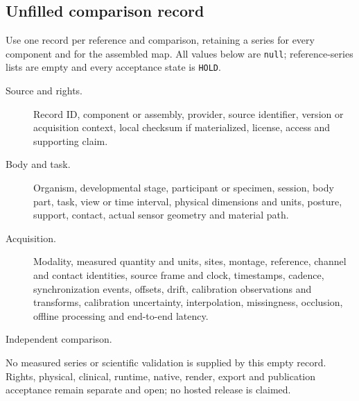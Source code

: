 \subsection*{Unfilled comparison record}

Use one record per reference and comparison, retaining a series for every
component and for the assembled map. All values below are \texttt{null};
reference-series lists are empty and every acceptance state is \texttt{HOLD}.

\begin{description}
\item[Source and rights.] Record ID, component or assembly, provider, source
identifier, version or acquisition context, local checksum if materialized,
license, access and supporting claim.
\item[Body and task.] Organism, developmental stage, participant or specimen,
session, body part, task, view or time interval, physical dimensions and units,
posture, support, contact, actual sensor geometry and material path.
\item[Acquisition.] Modality, measured quantity and units, sites, montage,
reference, channel and contact identities, source frame and clock, timestamps,
cadence, synchronization events, offsets, drift, calibration observations and
transforms, calibration uncertainty, interpolation, missingness, occlusion,
offline processing and end-to-end latency.
\item[Independent comparison.]
\end{description}

No measured series or scientific validation is supplied by this empty record.
Rights, physical, clinical, runtime, native, render, export and publication
acceptance remain separate and open; no hosted release is claimed.
